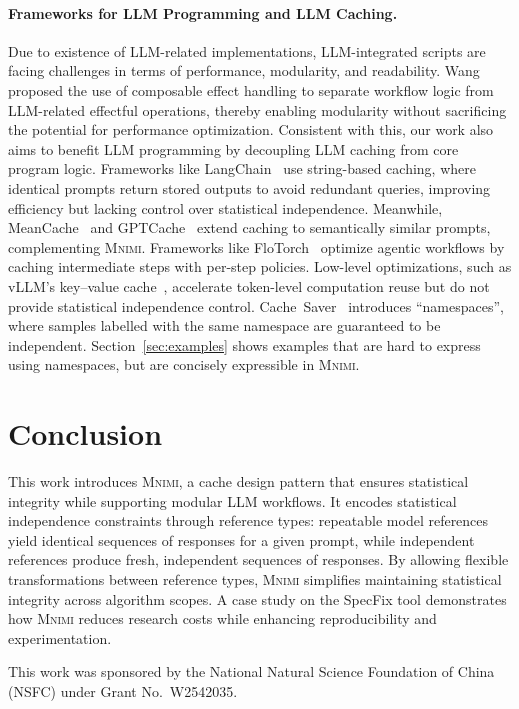 \documentclass[sigconf]{acmart}
\newcommand{\projName}{\textsc{Mnimi}\xspace}
\begin{document}
\paragraph{\textbf{Frameworks for LLM Programming and LLM Caching.}} Due to existence of LLM-related implementations, LLM-integrated scripts are facing challenges in terms of performance, modularity, and readability. Wang~\cite{LMPL:Wang25} proposed the use of composable effect handling to separate workflow logic from LLM-related effectful operations, thereby enabling modularity without sacrificing the potential for performance optimization. Consistent with this, our work also aims to benefit LLM programming by decoupling LLM caching from core program logic. Frameworks like LangChain~\cite{langchain2023} use string-based caching, where identical prompts return stored outputs to avoid redundant queries, improving efficiency but lacking control over statistical independence. Meanwhile, MeanCache~\cite{meancache2024} and GPTCache~\cite{bang-2023-gptcache} extend caching to semantically similar prompts, complementing \projName. Frameworks like FloTorch~\cite{flotorch2025} optimize agentic workflows by caching intermediate steps with per-step policies. Low-level optimizations, such as vLLM’s key–value cache~\cite{kwon2023vllm}, accelerate token-level computation reuse but do not provide statistical independence control. Cache\ Saver~\cite{potamitiscache} introduces ``namespaces'', where samples labelled with the same namespace are guaranteed to be independent. Section~\ref{sec:examples} shows examples that are hard to express using namespaces, but are concisely expressible in \projName.

\section{Conclusion}


This work introduces \projName, a cache design pattern that ensures statistical integrity while supporting modular LLM workflows. It encodes statistical independence constraints through reference types: repeatable model references yield identical sequences of responses for a given prompt, while independent references produce fresh, independent sequences of responses. By allowing flexible transformations between reference types, \projName simplifies maintaining statistical integrity across algorithm scopes. A case study on the SpecFix tool demonstrates how \projName reduces research costs while enhancing reproducibility and experimentation.

\begin{acks}
This work was sponsored by the National Natural Science Foundation of China (NSFC) under Grant No.\ W2542035.

\end{acks}




\appendix
\end{document}
